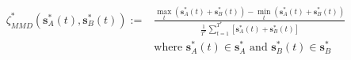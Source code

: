 \begin{equation}
\begin{split}
	\zeta^*_{MMD}(\textbf{s}^*_{A}(t), \textbf{s}^*_{B}(t)) :=& \frac{\max_t\left(\textbf{s}^*_{A}(t)+\textbf{s}^*_{B}(t)\right) - \min_t\left(\textbf{s}^*_{A}(t)+\textbf{s}^*_{B}(t)\right)}{\frac{1}{T^*}\sum_{t=1}^{T^*}\left[\textbf{s}^*_{A}(t)+\textbf{s}^*_{B}(t)\right]}\\
	&\text{where } \textbf{s}^*_{A}(t) \in \textbf{s}^*_{A} \text{ and } \textbf{s}^*_{B}(t) \in \textbf{s}^*_{B}
\end{split}
\label{ch1:equ:min-max-difference-definition}
\end{equation}